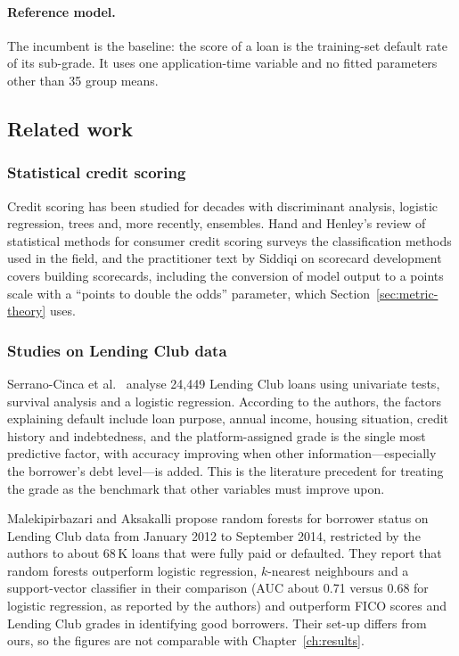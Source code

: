 \paragraph{Reference model.} The incumbent is the  baseline: the score of a loan is the training-set default rate of its sub-grade. It uses one application-time variable and no fitted parameters other than 35 group means.

\subsection{Related work}
\label{sec:related}

\subsubsection{Statistical credit scoring}

Credit scoring has been studied for decades with discriminant analysis, logistic regression, trees and, more recently, ensembles. Hand and Henley's review of statistical methods for consumer credit scoring \cite{hand1997} surveys the classification methods used in the field, and the practitioner text by Siddiqi on scorecard development \cite{siddiqi2017} covers building scorecards, including the conversion of model output to a points scale with a ``points to double the odds'' parameter, which Section~\ref{sec:metric-theory} uses.

\subsubsection{Studies on Lending Club data}

Serrano-Cinca et al.\ \cite{serrano2015} analyse 24,449 Lending Club loans using univariate tests, survival analysis and a logistic regression. According to the authors, the factors explaining default include loan purpose, annual income, housing situation, credit history and indebtedness, and the platform-assigned grade is the single most predictive factor, with accuracy improving when other information---especially the borrower's debt level---is added. This is the literature precedent for treating the grade as the benchmark that other variables must improve upon.

Malekipirbazari and Aksakalli \cite{malekipirbazari2015} propose random forests for borrower status on Lending Club data from January 2012 to September 2014, restricted by the authors to about 68\,K loans that were fully paid or defaulted. They report that random forests outperform logistic regression, $k$-nearest neighbours and a support-vector classifier in their comparison (AUC about 0.71 versus 0.68 for logistic regression, as reported by the authors) and outperform FICO scores and Lending Club grades in identifying good borrowers. Their set-up differs from ours, so the figures are not comparable with Chapter~\ref{ch:results}.

